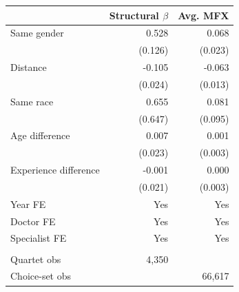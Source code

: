 
\begin{tabular}{lrr}
\toprule
 & Structural $\beta$ & Avg. MFX\\
\midrule
Same gender & 0.528 & 0.068\\
 & (0.126) & (0.023)\\
Distance & -0.105 & -0.063\\
 & (0.024) & (0.013)\\
Same race & 0.655 & 0.081\\
 & (0.647) & (0.095)\\
Age difference & 0.007 & 0.001\\
 & (0.023) & (0.003)\\
Experience difference & -0.001 & 0.000\\
 & (0.021) & (0.003)\\
\midrule
Year FE & Yes & Yes\\
Doctor FE & Yes & Yes\\
Specialist FE & Yes & Yes\\
\midrule\\
Quartet obs & 4,350 & \\
Choice-set obs &  & 66,617\\
\bottomrule
\end{tabular}
